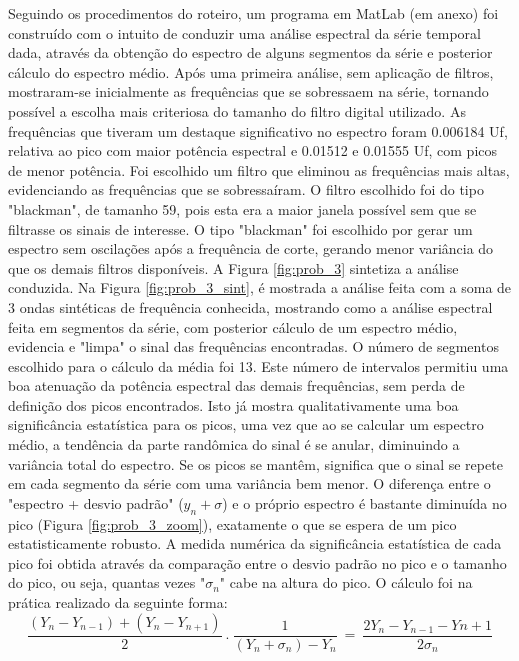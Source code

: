 \documentclass[12pt,portuguese,a4paper,pdftex]{article}
\begin{document}
Seguindo os procedimentos do roteiro, um programa em MatLab (em anexo) foi construído com o intuito de conduzir uma análise espectral da série temporal dada, através da obtenção do espectro de alguns segmentos da série e posterior cálculo do espectro médio. Após uma primeira análise, sem aplicação de filtros, mostraram-se inicialmente as frequências que se sobressaem na série, tornando possível a escolha mais criteriosa do tamanho do filtro digital utilizado. As frequências que tiveram um destaque significativo no espectro foram 0.006184 Uf, relativa ao pico com maior potência espectral e 0.01512 e 0.01555 Uf, com picos de menor potência. Foi escolhido um filtro que eliminou as frequências mais altas, evidenciando as frequências que se sobressaíram. O filtro escolhido foi do tipo "blackman", de tamanho 59, pois esta era a maior janela possível sem que se filtrasse os sinais de interesse. O tipo "blackman"  foi escolhido por gerar um espectro sem oscilações após a frequência de corte, gerando menor variância do que os demais filtros disponíveis. A Figura \ref{fig:prob_3} sintetiza a análise conduzida. Na Figura \ref{fig:prob_3_sint}, é mostrada a análise feita com a soma de 3 ondas sintéticas de frequência conhecida, mostrando como a análise espectral feita em segmentos da série, com posterior cálculo de um espectro médio, evidencia e "limpa" o sinal das frequências encontradas. O número de segmentos escolhido para o cálculo da média foi 13. Este número de intervalos permitiu uma boa atenuação da potência espectral das demais frequências, sem perda de definição dos picos encontrados. Isto já mostra qualitativamente uma boa significância estatística para os picos, uma vez que ao se calcular um espectro médio, a tendência da parte randômica do sinal é se anular, diminuindo a variância total do espectro. Se os picos se mantêm, significa que o sinal se repete em cada segmento da série com uma variância bem menor. O diferença entre o "espectro + desvio padrão" ($y_n + \sigma$) e o próprio espectro é bastante diminuída no pico (Figura \ref{fig:prob_3_zoom}), exatamente o que se espera de um pico estatisticamente robusto.  A medida numérica da significância estatística de cada pico foi obtida através da comparação entre o desvio padrão no pico e o tamanho do pico, ou seja, quantas vezes "$\sigma_n$" cabe na altura do pico. O cálculo foi na prática realizado da seguinte forma:\\

\begin{equation}
\frac{(Y_n-Y_{n-1})+(Y_n-Y_{n+1})}{2}\  .\  \frac{1}{(Y_n+\sigma_n)-Y_n} \ = \ \frac{2Y_n-Y_{n-1}-Y{n+1}}{2\sigma_n}
\end{equation}
\end{document}
